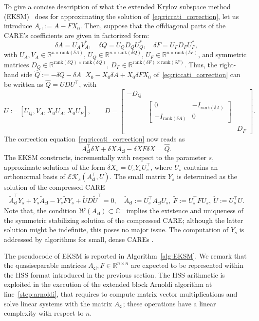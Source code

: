 \documentclass[a4paper,10pt]{article}
\def\rank{\mathrm{rank}}
\newcommand{\R}{\mathbb{R}}
\begin{document}
To give a concise description of what the extended Krylov subspace method (EKSM)~\cite{simoncini07} does for approximating  the solution of~\eqref{eq:riccati_correction}, let us introduce 
$A_{\mathsf{cl}}:= A- FX_0$. Then,  suppose that the offdiagonal parts of the CARE's coefficients are given in factorized form:
\[
\delta A=U_AV_A^*, \quad \delta
Q=U_QD_QU_Q^*, \quad \delta F=U_FD_FU_F^*,
\]
with $U_A,V_A\in\R^{n\times \rank{(\delta A)}}$, $U_Q\in\R^{n\times \rank{(\delta Q)}}$, $U_F\in\R^{n\times \rank{(\delta F)}}$, and symmetric matrices $D_Q \in\R^{\rank{(\delta Q)}\times \rank{(\delta Q)}}$, $D_F \in\R^{\rank{(\delta F)}\times \rank{(\delta F)}}$. Thus, the right-hand side $\widehat Q:= -\delta Q-\delta A^\top X_0-X_0\delta A +X_0\delta F X_0$ of~\eqref{eq:riccati_correction} can be written as $\widehat Q= UDU^\top$, with 
\begin{equation*}\label{eq:rhs-fact}
	U:=[U_Q,V_A,X_0U_A,X_0U_F], \qquad D=\begin{bmatrix} -D_Q\\ &
	\begin{bmatrix} 0&-I_{\rank{(\delta A)}}\\ -I_{\rank{(\delta A)}}&0\end{bmatrix}\\ &&D_F\end{bmatrix}.
\end{equation*}
The correction equation~\eqref{eq:riccati_correction} now reads as
$$
	A_{\mathsf{cl}}^\top\delta X +\delta XA_{\mathsf{cl}}- \delta XF\delta X = \widehat Q.
$$
The EKSM constructs, incrementally with respect to the parameter $s$, approximate solutions of the form $\delta X_s=U_sY_sU_s^\top$, where 
$U_s$ contains an orthonormal basis of  $\mathcal {EK}_s(A^\top_{\mathsf{cl}},U)$. The small matrix 
$Y_s$ is determined as the solution of the compressed CARE
\begin{align*}
	\tilde A^\top_{\mathsf{cl}}Y_s+Y_s\tilde A_{\mathsf{cl}}-Y_s\tilde FY_s +  \tilde UD\tilde U^\top= 0,\quad \tilde A_{\mathsf{cl}}:=U_s^\top A_{\mathsf{cl}}U_s,~\tilde F:=U_s^\top FU_s,~\tilde U:=U_s^\top U.
\end{align*}
Note that, the condition $\mathcal W(A_{\mathsf{cl}})\subset \mathbb C^-$ implies the existence and uniqueness of the symmetric stabilizing solution of the compressed CARE; although the latter solution might be indefinite, this poses no major issue. The computation of $Y_s$ is addressed by algorithms for small, dense CAREs \cite{benner2015numerical}. 

The pseudocode of EKSM is reported in Algorithm~\ref{alg:EKSM}. We remark that the quasiseparable matrices $A_{\mathsf{cl}},F\in\mathbb R^{n\times n}$ are expected to be represented within the HSS format introduced in the previous section. The HSS arithmetic is  exploited in  the execution of the extended block Arnoldi algorithm at line~\ref{step:arnoldi}, that requires to compute matrix vector multiplications and solve linear systems with the matrix $A_{\mathsf{cl}}$; these operations have a linear complexity with respect to $n$.
\end{document}

